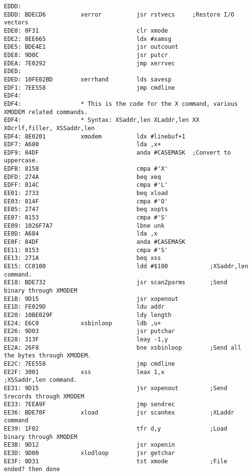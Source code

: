 {\begin{verbatim}
EDDD:                                 
EDDD: BDECD6          xerror          jsr rstvecs     ;Restore I/O vectors
EDE0: 0F31                            clr xmode
EDE2: 8EE665                          ldx #xamsg
EDE5: BDE4E1                          jsr outcount
EDE8: 9D0C                            jsr putcr
EDEA: 7E0292                          jmp xerrvec
EDED:                         
EDED: 10FE02BD        xerrhand        lds savesp
EDF1: 7EE558                          jmp cmdline
EDF4:                 
EDF4:                 * This is the code for the X command, various XMODEM related commands.
EDF4:                 * Syntax: XSaddr,len XLaddr,len XX XOcrlf,filler, XSSaddr,len
EDF4: 8E0201          xmodem          ldx #linebuf+1
EDF7: A680                            lda ,x+
EDF9: 84DF                            anda #CASEMASK  ;Convert to uppercase.
EDFB: 8158                            cmpa #'X'
EDFD: 274A                            beq xeq 
EDFF: 814C                            cmpa #'L'
EE01: 2733                            beq xload
EE03: 814F                            cmpa #'O'
EE05: 2747                            beq xopts
EE07: 8153                            cmpa #'S'
EE09: 1026F7A7                        lbne unk
EE0D: A684                            lda ,x
EE0F: 84DF                            anda #CASEMASK
EE11: 8153                            cmpa #'S'
EE13: 271A                            beq xss
EE15: CC0100                          ldd #$100            ;XSaddr,len command.
EE18: BDE732                          jsr scan2parms       ;Send binary through XMODEM
EE1B: 9D15                            jsr xopenout
EE1D: FE029D                          ldu addr
EE20: 10BE029F                        ldy length
EE24: E6C0            xsbinloop       ldb ,u+
EE26: 9D03                            jsr putchar             
EE28: 313F                            leay -1,y
EE2A: 26F8                            bne xsbinloop        ;Send all the bytes through XMODEM.
EE2C: 7EE558                          jmp cmdline
EE2F: 3001            xss             leax 1,x             ;XSSaddr,len command.
EE31: 9D15                            jsr xopenout         ;Send Srecords through XMODEM
EE33: 7EEA9F                          jmp sendrec             
EE36: BDE70F          xload           jsr scanhex          ;XLaddr command
EE39: 1F02                            tfr d,y              ;Load binary through XMODEM
EE3B: 9D12                            jsr xopenin
EE3D: 9D00            xlodloop        jsr getchar
EE3F: 0D31                            tst xmode            ;File ended? then done

\end{verbatim}}
